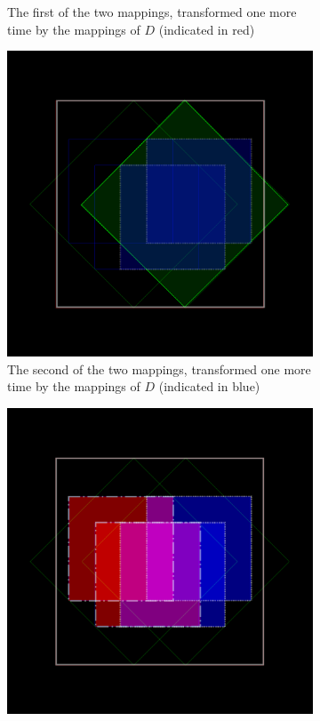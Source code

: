 \documentclass[11pt]{article}
\begin{document}
\begin{enumerate}
\begin{figure}
\begin{subfigure}[b]{0.4\textwidth}
         \caption{The first of the two mappings, transformed one more time by the mappings of $D$ (indicated in red)}
         \label{figure:dragon_curve_b}
     \end{subfigure}
     \hfill
     \begin{subfigure}[b]{0.4\textwidth}
         \centering
         \includegraphics[width=\textwidth]{figures/dragon_curve_c}
         \caption{The second of the two mappings, transformed one more time by the mappings of $D$ (indicated in blue)}
         \label{figure:dragon_curve_c}
     \end{subfigure}
     \hfill
     \begin{subfigure}[b]{0.4\textwidth}
         \centering
         \includegraphics[width=\textwidth]{figures/dragon_curve_d}

\end{subfigure}
\end{figure}
\end{enumerate}
\end{document}
